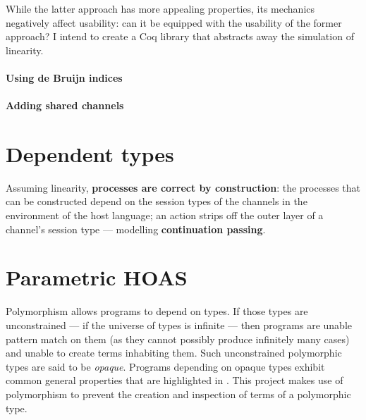 \documentclass{mproj}
\begin{document}
While the latter approach has more appealing properties, its mechanics negatively affect usability: can it be equipped with the usability of the former approach? I intend to create a Coq library that abstracts away the simulation of linearity.

\paragraph{Using de Bruijn indices}

\paragraph{Adding shared channels}

\section{Dependent types}\label{dependent-types}

\cite{Vasconcelos2010}

Assuming linearity, \textbf{processes are correct by construction}: the processes that can be constructed depend on the session types of the channels in the environment of the host language; an action strips off the outer layer of a channel's session type --- modelling \textbf{continuation passing}.

\section{Parametric HOAS}\label{phoas}

\cite{Wadler1989}
\cite{Chlipala2008}

Polymorphism allows programs to depend on types. If those types are unconstrained --- if the universe of types is infinite --- then programs are unable pattern match on them (as they cannot possibly produce infinitely many cases) and unable to create terms inhabiting them. Such unconstrained polymorphic types are said to be \emph{opaque}. Programs depending on opaque types exhibit common general properties that are highlighted in \cite{Wadler1989}. This project makes use of polymorphism to prevent the creation and inspection of terms of a polymorphic type.
\end{document}

